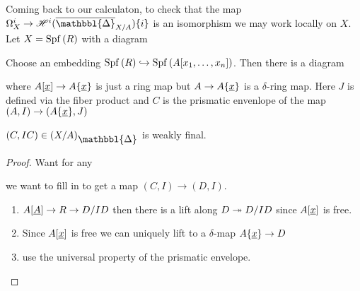 \documentclass[12pt]{article}
\newcommand{\Prism}{{\mathlarger{\mathbbl{\Delta}}}}
\begin{document}
Coming back to our calculaton, to check that the map $\Omega^i_X \to \H^i(\ol{\Prism}_{X/A}) \{ i \}$ is an isomorphism we may work locally on $X$. Let $X = \mathrm{Spf}\left( R \right)$ with a diagram
\begin{center}
\end{center}
Choose an embedding $\mathrm{Spf}\left( R \right) \hookrightarrow \mathrm{Spf}\left( A[x_1, \dots, x_n] \right)$. Then there is a diagram
\begin{center}
\end{center}
where $A[\underline{x}] \to A \{ \underline{x} \}$ is just a ring map but $A \to A \{ \underline{x} \}$ is a $\delta$-ring map. Here $J$ is defined via the fiber product and $C$ is the prismatic envenlope of the map $(A, I) \to (A \{ \underline{x} \}, J)$ 

\begin{prop}
$(C, IC) \in (X/A)_{\Prism}$ is weakly final.
\end{prop}

\begin{proof}
Want for any 
\begin{center}
\end{center}
we want to fill in to get a map $(C, I) \to (D, I)$. 
\begin{enumerate}
\item $A[\underline{A}] \to R \to D / I D$ then there is a lift along $D \twoheadrightarrow D/ID$ since $A[\underline{x}]$ is free. 
\item Since $A[ \underline{x} ]$ is free we can uniquely lift to a $\delta$-map $A \{ \underline{x} \} \to D$
\item use the universal property of the prismatic envelope.
\end{enumerate}
\end{proof}
\end{document}
